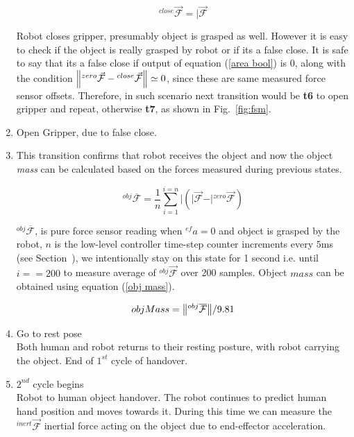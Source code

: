\begin{enumerate}[start=0,label={\bf{t}\arabic*:}]
        \begin{equation}\label{Fclose}
        {}^{close}\vec{\mathcal{F}} = \vert{\vec{\mathcal{F}}}
        \end{equation}
    
    Robot closes gripper, presumably object is grasped as well. However it is easy to check if the object is really grasped by robot or if its a false close. It is safe to say that its a false close if output of equation (\ref{area bool}) is $0$, along with the condition $\norm{{}^{zero}\vec{\mathcal{F}}-{}^{close}\vec{\mathcal{F}}} \simeq{0}$, since these are same measured force sensor offsets. Therefore, in such scenario next transition would be \textbf{t6} to open gripper and repeat, otherwise \textbf{t7}, as shown in Fig.~\ref{fig:fsm}.
    
    \item Open Gripper, due to false close.
    
    \item This transition confirms that robot receives the object and now the object \textit{mass} can be calculated based on the forces measured during previous states.
    
    \begin{equation}
        {}^{obj}\overline{\mathcal{F}} = \frac{1}{n}\sum_{i=1}^{i=n} \vert{ (\vert{\vec{\mathcal{F}}} - \vert{{}^{zero}\vec{\mathcal{F}}}) }
    \end{equation}
    
    ${}^{obj}\overline{\mathcal{F}}$, is pure force sensor reading when ${}^{ef}a=0$ and object is grasped by the robot, $n$ is the low-level controller time-step counter increments every $5$ms (see Section~), we intentionally stay on this state for 1 second i.e. until $i==200$ to measure average of ${}^{obj}\vec{\mathcal{F}}$ over 200 samples. Object $mass$ can be obtained using equation (\ref{obj mass}).
    
    \begin{equation}\label{obj mass}
        objMass = \norm{{}^{obj}\overline{\mathcal{F}}}/9.81
    \end{equation}

    \item Go to rest pose \\
    Both human and robot returns to their resting posture, with robot carrying the object. End of $1^{st}$ cycle of handover.
    
    \item $2^{nd}$ cycle begins\\
    Robot to human object handover. The robot continues to predict human hand position and moves towards it. During this time we can measure the ${}^{inert}\vec{\mathcal{F}}$ inertial force acting on the object due to end-effector acceleration.


\end{enumerate}
